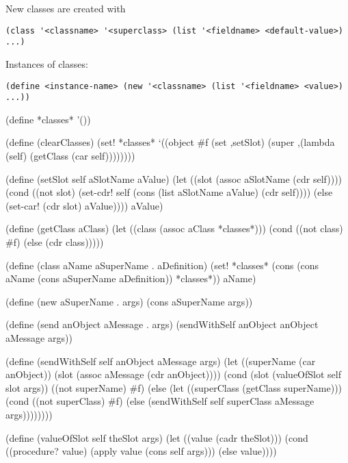 \documentclass[a4paper,10pt]{article}%
\theoremstyle{definition} \newtheorem{Def}{Definition}
\begin{document}
New classes are created with 
\begin{verbatim}
(class '<classname> '<superclass> (list '<fieldname> <default-value>) ...)
\end{verbatim}
Instances of classes:
\begin{verbatim}
(define <instance-name> (new '<classname> (list '<fieldname> <value>) ...))
\end{verbatim}

\nwenddocs{}\endmoddef\nwstartdeflinemarkup{}\nwenddeflinemarkup

(define *classes* '())


 (define (clearClasses)
  (set! *classes* 
    `((object #f 
      (set ,setSlot)
      (super
         ,(lambda (self)
            (getClass (car self))))))))


 (define (setSlot self aSlotName aValue)
  (let ((slot (assoc aSlotName (cdr self))))
    (cond
      ((not slot) 
        (set-cdr! self 
          (cons 
            (list aSlotName  aValue) 
            (cdr self))))
      (else
        (set-car! (cdr slot) aValue))))
  aValue)


 (define (getClass aClass)
  (let ((class (assoc aClass *classes*)))
      (cond
        ((not class) #f)
        (else (cdr class)))))


 (define (class aName aSuperName . aDefinition)
  (set! *classes* 
    (cons 
      (cons aName (cons aSuperName aDefinition))
      *classes*))
  aName)


 (define (new aSuperName . args)
  (cons aSuperName args))


 (define (send anObject aMessage . args)
  (sendWithSelf anObject anObject aMessage args))


 (define (sendWithSelf self anObject aMessage args)
  (let 
    ((superName (car anObject))
     (slot (assoc aMessage (cdr anObject))))
    (cond
      (slot (valueOfSlot self slot args))
      ((not superName) #f)
      (else 
        (let ((superClass (getClass superName)))
          (cond
            ((not superClass) #f)
            (else
              (sendWithSelf self superClass aMessage args))))))))


 (define (valueOfSlot self theSlot args)
  (let ((value (cadr theSlot)))
    (cond
      ((procedure? value)
        (apply value (cons self args)))
      (else value))))
\end{document}

